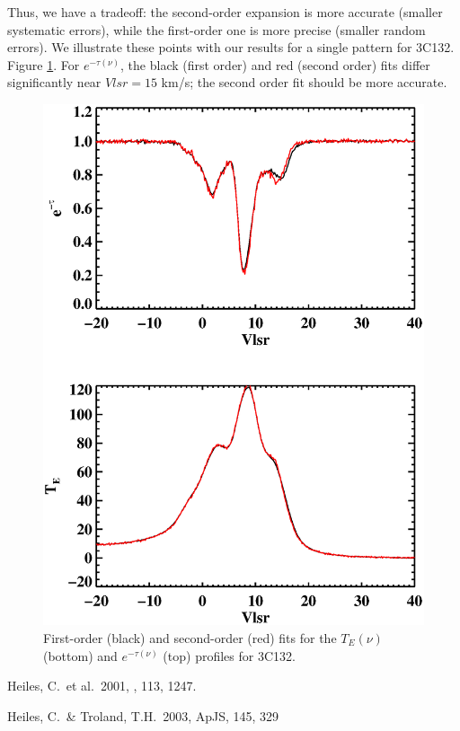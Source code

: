 \documentclass[12pt,preprint]{aastex}
\begin{document}
Thus, we have a tradeoff: the second-order expansion is more accurate
(smaller systematic errors), while the first-order one is more precise
(smaller random errors).  We illustrate these points with our results for
a single pattern for 3C132. Figure \ref{3c132fig}. For $e^{-\tau
  (\nu)}$, the black (first order) and red (second order) fits differ
significantly near $Vlsr=15$ km/s; the second order fit should be more
accurate.

\begin{figure}[h!]
\begin{center}
\includegraphics[scale=0.75] {z17mstst.ps} 
\end{center}
\caption{First-order (black) and second-order (red) fits for the
  $T_E(\nu)$ (bottom) and $e^{-\tau (\nu)}$ (top) profiles for
  3C132. \label{3c132fig}} \end{figure}



\begin{references}

 Heiles, C.\ et al.\ 2001, \pasp, 113, 1247.

 Heiles, C.\ \& Troland, T.H.\ 2003, ApJS, 145, 329

\end{references}
\end{document}
